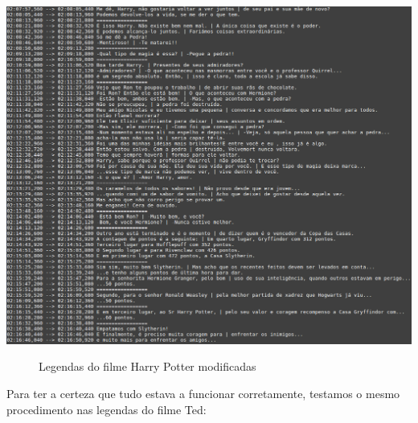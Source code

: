 \documentclass[a4paper]{article}
\begin{document}
\begin{center}
	\includegraphics[scale=0.35]{5}
	\begin{figure}[!h]
	\caption{Legendas do filme Harry Potter modificadas}
	\end{figure}
\end{center}

\vspace{200px}
Para ter a certeza que tudo estava a funcionar corretamente, testamos o mesmo procedimento nas legendas do filme Ted:
\end{document}
